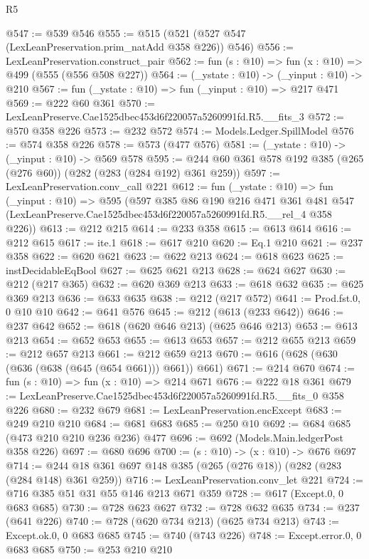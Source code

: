 \begin{lexlean}{R5}
\begin{coremodule}
@547 := @539 @546
@555 := @515 (@521 (@527 @547 (LexLeanPreservation.prim_natAdd @358 @226)) @546)
@556 := LexLeanPreservation.construct_pair
@562 := fun (s : @10) => fun (x : @10) => @499 (@555 (@556 @508 @227))
@564 := (_ystate : @10) -> (_yinput : @10) -> @210
@567 := fun (_ystate : @10) => fun (_yinput : @10) => @217 @471
@569 := @222 @60 @361
@570 := LexLeanPreserve.Cae1525dbec453d6f220057a5260991fd.R5.__fits_3
@572 := @570 @358 @226
@573 := @232 @572
@574 := Models.Ledger.SpillModel
@576 := @574 @358 @226
@578 := @573 (@477 @576)
@581 := (_ystate : @10) -> (_yinput : @10) -> @569 @578
@595 := @244 @60 @361 @578 @192 @385 (@265 (@276 @60)) (@282 (@283 (@284 @192) @361 @259))
@597 := LexLeanPreservation.conv_call @221
@612 := fun (_ystate : @10) =>
  fun (_yinput : @10) =>
  @595
    (@597
      @385
      @86
      @190
      @216
      @471
      @361
      @481
      @547
      (LexLeanPreserve.Cae1525dbec453d6f220057a5260991fd.R5.__rel_4 @358 @226))
@613 := @212 @215
@614 := @233 @358
@615 := @613 @614
@616 := @212 @615
@617 := ite.{1}
@618 := @617 @210
@620 := Eq.{1} @210
@621 := @237 @358
@622 := @620 @621
@623 := @622 @213
@624 := @618 @623
@625 := instDecidableEqBool
@627 := @625 @621 @213
@628 := @624 @627
@630 := @212 (@217 @365)
@632 := @620 @369 @213
@633 := @618 @632
@635 := @625 @369 @213
@636 := @633 @635
@638 := @212 (@217 @572)
@641 := Prod.fst.{0, 0} @10 @10
@642 := @641 @576
@645 := @212 (@613 (@233 @642))
@646 := @237 @642
@652 := @618 (@620 @646 @213) (@625 @646 @213)
@653 := @613 @213
@654 := @652 @653
@655 := @613 @653
@657 := @212 @655 @213
@659 := @212 @657 @213
@661 := @212 @659 @213
@670 := @616 (@628 (@630 (@636 (@638 (@645 (@654 @661))) @661)) @661)
@671 := @214 @670
@674 := fun (s : @10) => fun (x : @10) => @214 @671
@676 := @222 @18 @361
@679 := LexLeanPreserve.Cae1525dbec453d6f220057a5260991fd.R5.__fits_0 @358 @226
@680 := @232 @679
@681 := LexLeanPreservation.encExcept
@683 := @249 @210 @210
@684 := @681 @683
@685 := @250 @10
@692 := @684 @685 (@473 @210 @210 @236 @236) @477
@696 := @692 (Models.Main.ledgerPost @358 @226)
@697 := @680 @696
@700 := (s : @10) -> (x : @10) -> @676 @697
@714 := @244 @18 @361 @697 @148 @385 (@265 (@276 @18)) (@282 (@283 (@284 @148) @361 @259))
@716 := LexLeanPreservation.conv_let @221
@724 := @716 @385 @51 @31 @55 @146 @213 @671 @359
@728 := @617 (Except.{0, 0} @683 @685)
@730 := @728 @623 @627
@732 := @728 @632 @635
@734 := @237 (@641 @226)
@740 := @728 (@620 @734 @213) (@625 @734 @213)
@743 := Except.ok.{0, 0} @683 @685
@745 := @740 (@743 @226)
@748 := Except.error.{0, 0} @683 @685
@750 := @253 @210 @210

\end{coremodule}
\end{lexlean}
